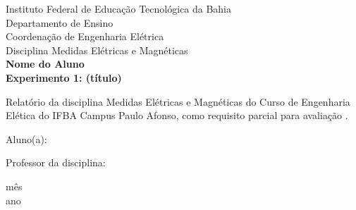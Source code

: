 \documentclass[a4paper, 12pt]{article}
\begin{document}
\begin{titlepage}
	\begin{center}
	

		\Large{Instituto Federal de Educação Tecnológica da Bahia}\\
		\large{Departamento de Ensino}\\ 
		\large{Coordenação de Engenharia Elétrica}\\ 
        \large{Disciplina Medidas Elétricas e Magnéticas}\\ 
        \vspace{115pt}
        \textbf{\Large{Nome do Aluno }}\\
		\vspace{15pt}
        \vspace{95pt}
        \textbf{\Large{Experimento 1: (título) }}\\
		\vspace{3,5cm}
	\end{center}
	
	\begin{flushright}

   \begin{list}{}{
      \setlength{\leftmargin}{10cm}
      \setlength{\rightmargin}{0cm}
      \setlength{\labelwidth}{0pt}
      \setlength{\labelsep}{\leftmargin}}

      \item Relatório da disciplina Medidas Elétricas e Magnéticas do Curso de Engenharia Elética do IFBA Campus Paulo Afonso, como requisito parcial para avaliação .

      \begin{list}{}{
      \setlength{\leftmargin}{0cm}
      \setlength{\rightmargin}{0cm}
      \setlength{\labelwidth}{0pt}
      \setlength{\labelsep}{\leftmargin}}

			
            \item Aluno(a): \
      		\item Professor da disciplina: \

      \end{list}
   \end{list}
\end{flushright}
\vspace{1cm}
\begin{center}
		\vspace{\fill}
		 mês\\
		 ano
			\end{center}
\end{titlepage}
\newpage
\newpage
\tableofcontents
\thispagestyle{empty}
\end{document}
